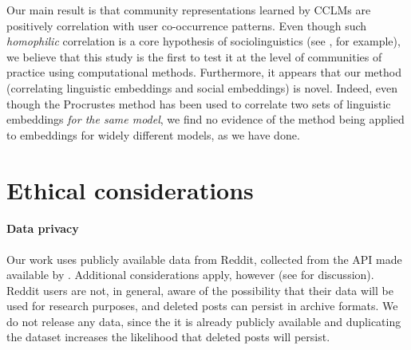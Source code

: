 \documentclass[11pt]{article}
\begin{document}

Our main result is that community representations learned by
CCLMs are positively correlation with user co-occurrence patterns.
Even though such \emph{homophilic} correlation is a core hypothesis of 
sociolinguistics (see \citet{Kovacs2020}, for example), 
we believe that this study is the first to test it at 
the level of communities of practice using computational methods.
Furthermore, it appears that our method (correlating
linguistic embeddings and social embeddings) is novel. Indeed, even
though the Procrustes method has been used to correlate two sets of
linguistic embeddings \emph{for the same model}, we find no evidence
of the method being applied to embeddings for widely different models,
as we have done.


\section{Ethical considerations}\label{sec:ethics}

\paragraph{Data privacy}
Our work uses publicly available data from Reddit,
collected from the API made available by \citet{Baumgartner2020}.
Additional considerations apply, however 
(see \citet{Gliniecka2021} for discussion). Reddit users are not,
in general, aware of the possibility that their data will be used 
for research purposes, and deleted posts can persist in archive formats.
We do not release any data, since the it is already publicly available 
and duplicating the dataset increases the likelihood that deleted 
posts will persist.
\end{document}
